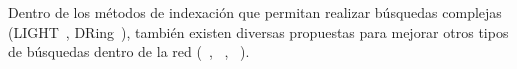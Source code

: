     Dentro de los métodos de indexación que permitan realizar
    búsquedas complejas (LIGHT~\cite{journals_tkde_TangZX10},
    DRing~\cite{hidalgo2011dring}), también existen diversas propuestas para mejorar otros tipos de
    búsquedas dentro de la red (~\cite{5345647}, ~\cite{Ng02peerclustering},
    ~\cite{conf:infocom:SripanidkulchaiMZ03}).
    
    
    
    
    
    
